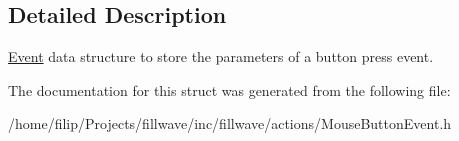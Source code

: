\subsection{Detailed Description}
\hyperlink{classfillwave_1_1actions_1_1Event}{Event} data structure to store the parameters of a button press event. 

The documentation for this struct was generated from the following file\+:\begin{DoxyCompactItemize}
\item 
/home/filip/\+Projects/fillwave/inc/fillwave/actions/Mouse\+Button\+Event.\+h\end{DoxyCompactItemize}
